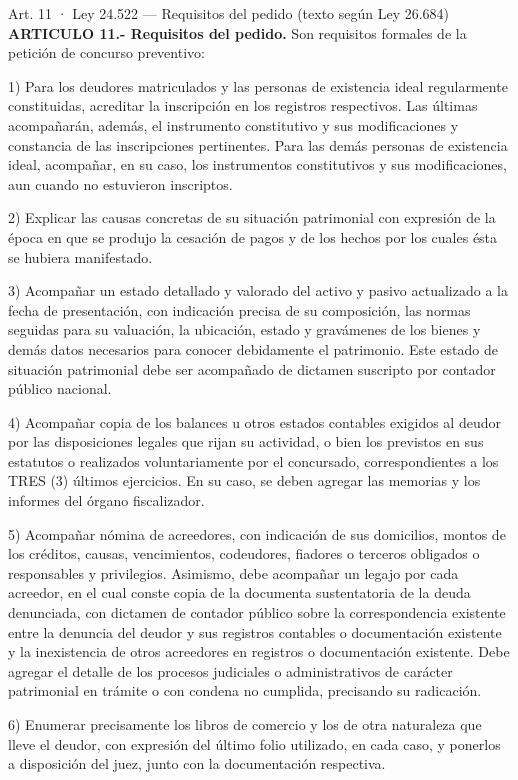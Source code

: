 \documentclass[12pt,oneside]{book}
\begin{document}
\begin{norma}{Art. 11 · Ley 24.522 — Requisitos del pedido (texto según Ley 26.684)}
\textbf{ARTICULO 11.- Requisitos del pedido.} Son requisitos formales de la petición de concurso preventivo:

1) Para los deudores matriculados y las personas de existencia ideal regularmente constituidas, acreditar la inscripción en los registros respectivos. Las últimas acompañarán, además, el instrumento constitutivo y sus modificaciones y constancia de las inscripciones pertinentes. Para las demás personas de existencia ideal, acompañar, en su caso, los instrumentos constitutivos y sus modificaciones, aun cuando no estuvieron inscriptos.

2) Explicar las causas concretas de su situación patrimonial con expresión de la época en que se produjo la cesación de pagos y de los hechos por los cuales ésta se hubiera manifestado.

3) Acompañar un estado detallado y valorado del activo y pasivo actualizado a la fecha de presentación, con indicación precisa de su composición, las normas seguidas para su valuación, la ubicación, estado y gravámenes de los bienes y demás datos necesarios para conocer debidamente el patrimonio. Este estado de situación patrimonial debe ser acompañado de dictamen suscripto por contador público nacional.

4) Acompañar copia de los balances u otros estados contables exigidos al deudor por las disposiciones legales que rijan su actividad, o bien los previstos en sus estatutos o realizados voluntariamente por el concursado, correspondientes a los TRES (3) últimos ejercicios. En su caso, se deben agregar las memorias y los informes del órgano fiscalizador.

5) Acompañar nómina de acreedores, con indicación de sus domicilios, montos de los créditos, causas, vencimientos, codeudores, fiadores o terceros obligados o responsables y privilegios. Asimismo, debe acompañar un legajo por cada acreedor, en el cual conste copia de la documenta sustentatoria de la deuda denunciada, con dictamen de contador público sobre la correspondencia existente entre la denuncia del deudor y sus registros contables o documentación existente y la inexistencia de otros acreedores en registros o documentación existente. Debe agregar el detalle de los procesos judiciales o administrativos de carácter patrimonial en trámite o con condena no cumplida, precisando su radicación.

6) Enumerar precisamente los libros de comercio y los de otra naturaleza que lleve el deudor, con expresión del último folio utilizado, en cada caso, y ponerlos a disposición del juez, junto con la documentación respectiva.


\end{norma}
\end{document}
